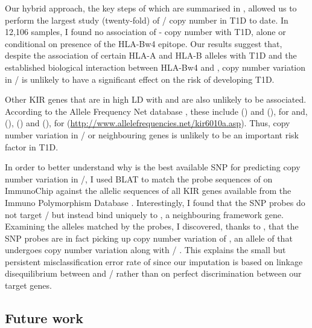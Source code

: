 Our hybrid approach, the key steps of which are summarised in , allowed us to perform the largest study (twenty-fold)
of / copy number in T1D to date.
In 12,106 samples, I found no association of - copy number with T1D, alone or conditional on presence of the HLA-Bw4 epitope.
Our results suggest that, despite the association of certain HLA-A and HLA-B alleles with T1D and the established biological interaction between HLA-Bw4 and ,
copy number variation in / is unlikely to have a significant effect on the risk of developing T1D.

Other KIR genes that are in high \gls{LD} with  and  are also unlikely to be associated. 
According to the Allele Frequency Net database \citep{GonzalezGalarza:2011gm}, these include  () and  (),
for  and,  (),  () and  (), for 
(\url{http://www.allelefrequencies.net/kir6010a.asp}).
Thus, copy number variation in / or neighbouring genes is unlikely to be an important risk factor in T1D.

In order to better understand why  is the best available SNP for predicting copy number variation in /, I used BLAT \citep{Kent:2002jd}
to match the probe sequences of  on ImmunoChip against the allelic sequences of all KIR genes available from the Immuno Polymorphism Database \citep{Robinson:2010dy}.
Interestingly, I found that the SNP probes do not target / but instead bind uniquely to , a neighbouring framework gene.
Examining the  alleles matched by the  probes, I discovered, thanks to , that the SNP probes are
in fact picking up copy number variation of ,
an allele of  that undergoes copy number variation along with / \citep{GomezLozano:2005hz}.  
This explains the small but persistent misclassification error rate of  since our imputation is based on linkage disequilibrium between  and / rather than on perfect discrimination between our target genes.

\subsection{Future work}


